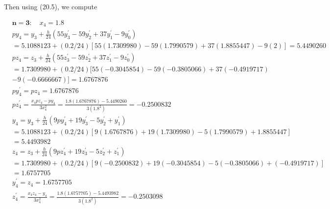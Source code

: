 \documentclass[10pt]{article}
\begin{document}
Then using (20.5), we compute

$$
\begin{aligned}
& \boldsymbol{n}=\mathbf{3}: \quad x_{4}=1.8 \\
& p y_{4}=y_{3}+\frac{h}{24}\left(55 y_{3}^{\prime}-59 y_{2}^{\prime}+37 y_{1}^{\prime}-9 y_{0}^{\prime}\right) \\
& =5.1088123+(0.2 / 24)[55(1.7309980)-59(1.7990579)+37(1.8855447)-9(2)]=5.4490260 \\
& p z_{4}=z_{3}+\frac{h}{24}\left(55 z_{3}^{\prime}-59 z_{2}^{\prime}+37 z_{1}^{\prime}-9 z_{0}^{\prime}\right) \\
& =1.7309980+(0.2 / 24)[55(-0.3045854)-59(-0.3805066)+37(-0.4919717) \\
& -9(-0.6666667)]=1.6767876 \\
& p y_{4}^{\prime}=p z_{4}=1.6767876 \\
& p z_{4}^{\prime}=\frac{x_{4} p z_{4}-p y_{4}}{3 x_{4}^{2}}=\frac{1.8(1.6767876)-5.4490260}{3\left(1.8^{2}\right)}=-0.2500832 \\
& y_{4}=y_{3}+\frac{h}{24}\left(9 p y_{4}^{\prime}+19 y_{3}^{\prime}-5 y_{2}^{\prime}+y_{1}^{\prime}\right) \\
& =5.1088123+(0.2 / 24)[9(1.6767876)+19(1.7309980)-5(1.7990579)+1.8855447] \\
& =5.4493982 \\
& z_{4}=z_{3}+\frac{h}{24}\left(9 p z_{4}^{\prime}+19 z_{3}^{\prime}-5 z_{2}^{\prime}+z_{1}^{\prime}\right) \\
& =1.7309980+(0.2 / 24)[9(-0.2500832)+19(-0.3045854)-5(-0.3805066)+(-0.4919717)] \\
& =1.6757705 \\
& y_{4}^{\prime}=z_{4}=1.6757705 \\
& z_{4}^{\prime}=\frac{x_{4} z_{4}-y_{4}}{3 x_{4}^{2}}=\frac{1.8(1.6757705)-5.4493982}{3\left(1.8^{2}\right)}=-0.2503098
\end{aligned}
$$
\end{document}
